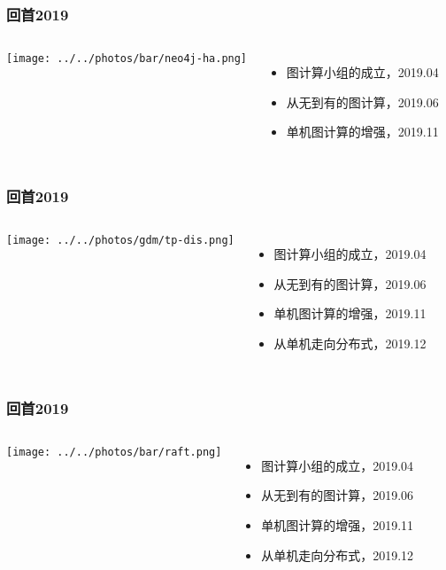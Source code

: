 \documentclass{beamer}
\begin{document}
  \begin{frame}
    \frametitle{回首2019}
  \begin{columns}
  \texttt{[image: ../../photos/bar/neo4j-ha.png]}

  \begin{itemize}
  \item 图计算小组的成立，2019.04
  \item 从无到有的图计算，2019.06
  \item 单机图计算的增强，2019.11
  \end{itemize}
  \end{columns}

  \end{frame}


  \begin{frame}
    \frametitle{回首2019}
  \begin{columns}
  \texttt{[image: ../../photos/gdm/tp-dis.png]}

  \begin{itemize}
  \item 图计算小组的成立，2019.04
  \item 从无到有的图计算，2019.06
  \item 单机图计算的增强，2019.11
  \item 从单机走向分布式，2019.12
  \end{itemize}
  \end{columns}

  \end{frame}

  \begin{frame}
    \frametitle{回首2019}
  \begin{columns}
  \texttt{[image: ../../photos/bar/raft.png]}

  \begin{itemize}
  \item 图计算小组的成立，2019.04
  \item 从无到有的图计算，2019.06
  \item 单机图计算的增强，2019.11
  \item 从单机走向分布式，2019.12
  \end{itemize}
  \end{columns}

  \end{frame}
\end{document}
